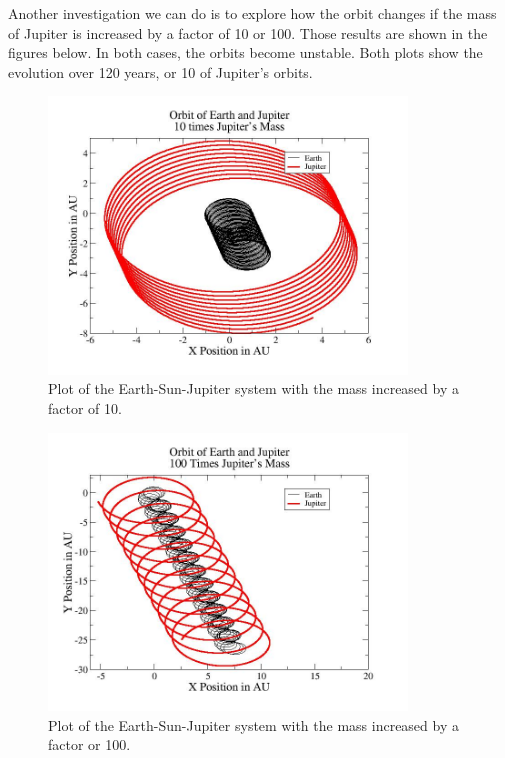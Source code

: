 \documentclass[%
oneside,                 %
final,                   %
10pt]{article}
\begin{document}
Another investigation we can do is to explore how the orbit changes if the mass of Jupiter is increased by a factor of 10 or 100.  Those results are shown in the figures below.  In both cases, the orbits become unstable.  Both plots show the evolution over 120 years, or 10 of Jupiter's orbits.

\begin{figure}[H]\label{fig:velrplot}
  \centering
    \includegraphics[width=0.85\textwidth]{tenplot.jpg}
    \caption{Plot of the Earth-Sun-Jupiter system with the mass increased by a factor of 10.}
\end{figure}

\begin{figure}[H]\label{fig:velrplot}
  \centering
    \includegraphics[width=0.85\textwidth]{Jupiter100.jpg}
    \caption{Plot of the Earth-Sun-Jupiter system with the mass increased by a factor or 100.}
\end{figure}
\end{document}
